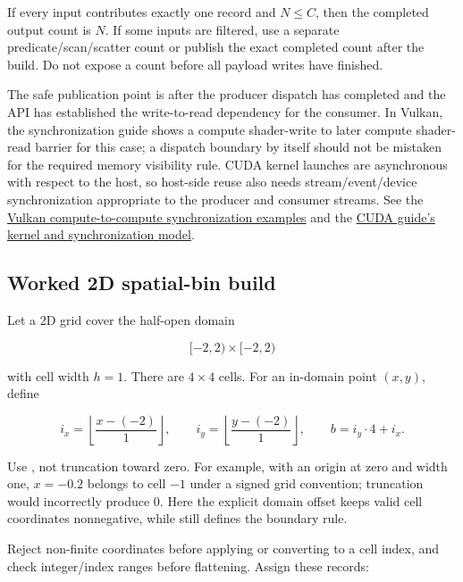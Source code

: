 If every input contributes exactly one record and \(N\le C\), then the completed output count is \(N\). If some inputs are filtered, use a separate predicate/scan/scatter count or publish the exact completed count after the build. Do not expose a count before all payload writes have finished.

The safe publication point is after the producer dispatch has completed and the API has established the write-to-read dependency for the consumer. In Vulkan, the synchronization guide shows a compute shader-write to later compute shader-read barrier for this case; a dispatch boundary by itself should not be mistaken for the required memory visibility rule. CUDA kernel launches are asynchronous with respect to the host, so host-side reuse also needs stream/event/device synchronization appropriate to the producer and consumer streams. See the \href{https://docs.vulkan.org/guide/latest/synchronization_examples.html}{Vulkan compute-to-compute synchronization examples} and the \href{https://docs.nvidia.com/cuda/cuda-programming-guide/02-basics/intro-to-cuda-cpp.html}{CUDA guide's kernel and synchronization model}.

\subsection{Worked 2D spatial-bin build}\label{03-visual-computing-i-ch016-worked-2d-spatial-bin-build}

\hypertarget{03-visual-computing-i-ch016-worked-2d-spatial-bin-build}{}

Let a 2D grid cover the half-open domain

\[
[-2,2)\times[-2,2)
\]

with cell width \(h=1\). There are \(4\times4\) cells. For an in-domain point \((x,y)\), define

\[
i_x=\left\lfloor\frac{x-(-2)}{1}\right\rfloor,
\qquad
i_y=\left\lfloor\frac{y-(-2)}{1}\right\rfloor,
\qquad
b=i_y\cdot4+i_x.
\]

Use , not truncation toward zero. For example, with an origin at zero and width one, \(x=-0.2\) belongs to cell \(-1\) under a signed grid convention; truncation would incorrectly produce \(0\). Here the explicit domain offset keeps valid cell coordinates nonnegative, while  still defines the boundary rule.

Reject non-finite coordinates before applying  or converting to a cell index, and check integer/index ranges before flattening. Assign these records:

